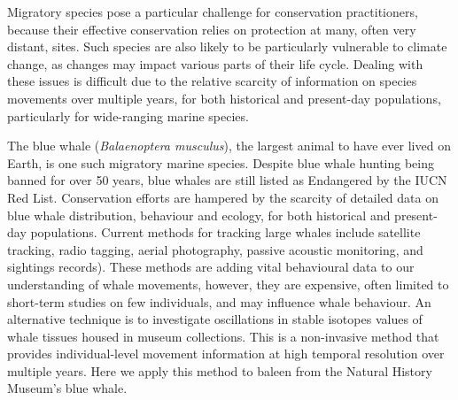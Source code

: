 \documentclass[a4paper,12pt]{article}
\begin{document}
Migratory species pose a particular challenge for conservation practitioners, because their effective conservation relies on protection at many, often very distant, sites\cite{runge2014conserving}. 
Such species are also likely to be particularly vulnerable to climate change, as changes may impact various parts of their life cycle\cite{robinson2009travelling}. 
Dealing with these issues is difficult due to the relative scarcity of information on species movements over multiple years, for both historical and present-day populations, particularly for wide-ranging marine species\cite{ryan2013stable,hall2005stable,bailey2009behavioural}. 
 
The blue whale (\textit{Balaenoptera musculus}), the largest animal to have ever lived on Earth, is one such migratory marine species. 
Despite blue whale hunting being banned for over 50 years, blue whales are still listed as Endangered by the IUCN Red List\cite{reilly2008balaenoptera}.
Conservation efforts are hampered by the scarcity of detailed data on blue whale distribution, behaviour and ecology, for both historical and present-day populations. 
Current methods for tracking large whales include satellite tracking, radio tagging, aerial photography, passive acoustic monitoring, and sightings records\cite{borger15,mcdonald2006biogeographic,bailey2009behavioural,mate2007evolution}). 
These methods are adding vital behavioural data to our understanding of whale movements, however, they are expensive, often limited to short-term studies on few individuals\cite{bailey2009behavioural,best2015tag,mate2007evolution}, and may influence whale behaviour\cite{walker2012review}. 
An alternative technique is to investigate oscillations in stable isotopes values of whale tissues housed in museum collections\cite{ryan2013stable}.
This is a non-invasive method that provides individual-level movement information at high temporal resolution over multiple years. 
Here we apply this method to baleen from the Natural History Museum's blue whale.
 
\end{document}
